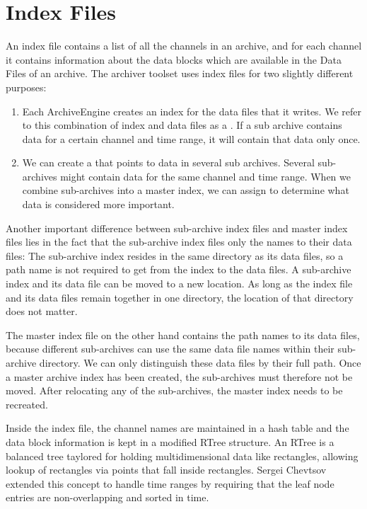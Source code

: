 \section{Index Files}
An index file contains a list of all the channels in an archive, and
for each channel it contains information about the data blocks which
are available in the Data Files of an archive.
The archiver toolset uses index files for two slightly different
purposes:
\begin{enumerate}
\item Each ArchiveEngine creates an index for the data files
      that it writes.
      We refer to this combination of index and data files
      as a .
      If a sub archive contains data for a certain channel and time
      range, it will contain that data only once.
\item We can create a  that points to data
      in several sub archives.
      Several sub-archives might contain data for the same channel
      and time range. When we combine sub-archives into a master
      index, we can assign  to
      determine what data is considered more important.
\end{enumerate}

\noindent Another important difference between sub-archive index files
and master index files lies in the fact that the sub-archive index
files only the names to their data files: The sub-archive index
resides in the same directory as its data files, so a path name is not
required to get from the index to the data files.
A sub-archive index and its data file can be moved to a new
location. As long as the index file and its data files remain
together in one directory, the location of that directory does not matter.

The master index file on the other hand contains the path names to its
data files, because different sub-archives can use the same data file
names within their sub-archive directory. We can only distinguish these
data files by their full path.  Once a master archive index has been
created, the sub-archives must therefore not be moved. After
relocating any of the sub-archives, the master index needs to be recreated.

Inside the index file, the channel names are maintained in a hash
table and the data block information is kept in a modified RTree
structure.  An RTree \cite{guttman84} is a balanced tree taylored for
holding multidimensional data like rectangles, allowing lookup of
rectangles via points that fall inside rectangles.  Sergei Chevtsov
extended this concept to handle time ranges by requiring that the leaf
node entries are non-overlapping and sorted in time.

